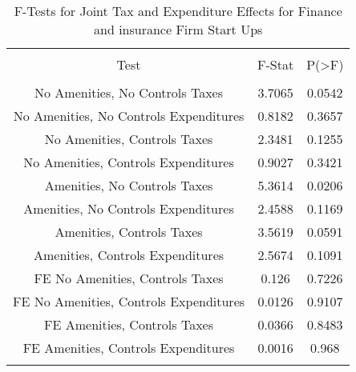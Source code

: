 
\begin{table}[!htbp] \centering 
  \caption{F-Tests for Joint Tax and Expenditure Effects for Finance and insurance Firm Start Ups} 
  \label{52Ftests} 
\begin{tabular}{@{\extracolsep{5pt}} ccc} 
\\[-1.8ex]\hline 
\hline \\[-1.8ex] 
Test & F-Stat & P(\textgreater F) \\ 
\hline \\[-1.8ex] 
No Amenities, No Controls Taxes & 3.7065 & 0.0542 \\ 
No Amenities, No Controls Expenditures & 0.8182 & 0.3657 \\ 
No Amenities, Controls Taxes & 2.3481 & 0.1255 \\ 
No Amenities, Controls Expenditures & 0.9027 & 0.3421 \\ 
Amenities, No Controls Taxes & 5.3614 & 0.0206 \\ 
Amenities, No Controls Expenditures & 2.4588 & 0.1169 \\ 
Amenities, Controls Taxes & 3.5619 & 0.0591 \\ 
Amenities, Controls Expenditures & 2.5674 & 0.1091 \\ 
FE No Amenities, Controls Taxes & 0.126 & 0.7226 \\ 
FE No Amenities, Controls Expenditures & 0.0126 & 0.9107 \\ 
FE Amenities, Controls Taxes & 0.0366 & 0.8483 \\ 
FE Amenities, Controls Expenditures & 0.0016 & 0.968 \\ 
\hline \\[-1.8ex] 
\end{tabular} 
\end{table} 

